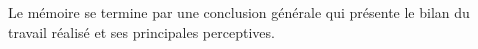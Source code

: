 \begin{onehalfspace}
\noindent Le mémoire se termine par une conclusion générale qui présente le bilan du travail réalisé et ses principales perceptives.





\clearpage

\end{onehalfspace}